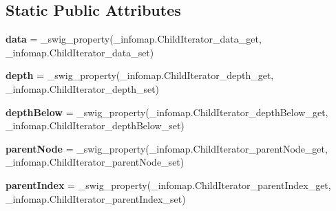 \subsection*{Static Public Attributes}
\begin{DoxyCompactItemize}
\item 
\mbox{\label{classdsmacc_1_1graph_1_1infomap_1_1infomap_1_1ChildIterator_a0da4d0c288f28a0bcb9d8ea2cfe33f2f}} 
{\bfseries data} = \+\_\+swig\+\_\+property(\+\_\+infomap.\+Child\+Iterator\+\_\+data\+\_\+get, \+\_\+infomap.\+Child\+Iterator\+\_\+data\+\_\+set)
\item 
\mbox{\label{classdsmacc_1_1graph_1_1infomap_1_1infomap_1_1ChildIterator_a1da5f41157a0fd76cfa802eca696f45d}} 
{\bfseries depth} = \+\_\+swig\+\_\+property(\+\_\+infomap.\+Child\+Iterator\+\_\+depth\+\_\+get, \+\_\+infomap.\+Child\+Iterator\+\_\+depth\+\_\+set)
\item 
\mbox{\label{classdsmacc_1_1graph_1_1infomap_1_1infomap_1_1ChildIterator_a2b6516a6285f74a3a9a36b7b8d052701}} 
{\bfseries depth\+Below} = \+\_\+swig\+\_\+property(\+\_\+infomap.\+Child\+Iterator\+\_\+depth\+Below\+\_\+get, \+\_\+infomap.\+Child\+Iterator\+\_\+depth\+Below\+\_\+set)
\item 
\mbox{\label{classdsmacc_1_1graph_1_1infomap_1_1infomap_1_1ChildIterator_a8dd046f386ecd1faf851f15935b3f729}} 
{\bfseries parent\+Node} = \+\_\+swig\+\_\+property(\+\_\+infomap.\+Child\+Iterator\+\_\+parent\+Node\+\_\+get, \+\_\+infomap.\+Child\+Iterator\+\_\+parent\+Node\+\_\+set)
\item 
\mbox{\label{classdsmacc_1_1graph_1_1infomap_1_1infomap_1_1ChildIterator_a0d6ecefdf485fc2e40dc061cf78956d9}} 
{\bfseries parent\+Index} = \+\_\+swig\+\_\+property(\+\_\+infomap.\+Child\+Iterator\+\_\+parent\+Index\+\_\+get, \+\_\+infomap.\+Child\+Iterator\+\_\+parent\+Index\+\_\+set)
\item 
\mbox{\label{classdsmacc_1_1graph_1_1infomap_1_1infomap_1_1ChildIterator_a99605e6d2685e580fb93de90b6af4700}} 

\end{DoxyCompactItemize}
